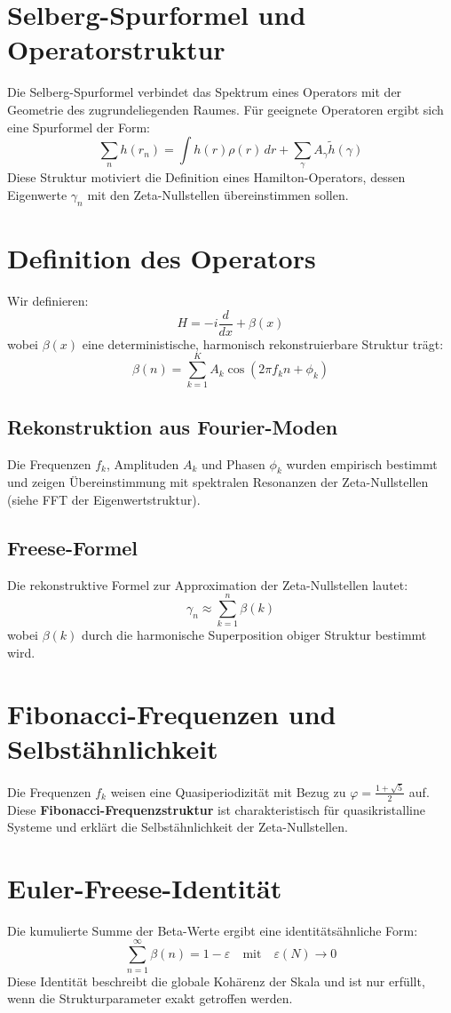 \documentclass[12pt]{article}
\begin{document}
\section{Selberg-Spurformel und Operatorstruktur}

Die Selberg-Spurformel verbindet das Spektrum eines Operators mit der Geometrie des zugrundeliegenden Raumes. Für geeignete Operatoren ergibt sich eine Spurformel der Form:
\[
\sum_n h(r_n) = \int h(r) \rho(r) \, dr + \sum_\gamma A_\gamma \tilde{h}(\gamma)
\]
Diese Struktur motiviert die Definition eines Hamilton-Operators, dessen Eigenwerte \(\gamma_n\) mit den Zeta-Nullstellen übereinstimmen sollen.

\section{Definition des Operators}
Wir definieren:
\[
H = -i \frac{d}{dx} + \beta(x)
\]
wobei \(\beta(x)\) eine deterministische, harmonisch rekonstruierbare Struktur trägt:
\[
\beta(n) = \sum_{k=1}^K A_k \cos(2\pi f_k n + \phi_k)
\]

\subsection{Rekonstruktion aus Fourier-Moden}
Die Frequenzen \(f_k\), Amplituden \(A_k\) und Phasen \(\phi_k\) wurden empirisch bestimmt und zeigen Übereinstimmung mit spektralen Resonanzen der Zeta-Nullstellen (siehe FFT der Eigenwertstruktur).

\subsection{Freese-Formel}
Die rekonstruktive Formel zur Approximation der Zeta-Nullstellen lautet:
\[
\gamma_n \approx \sum_{k=1}^{n} \beta(k)
\]
wobei \(\beta(k)\) durch die harmonische Superposition obiger Struktur bestimmt wird.

\section{Fibonacci-Frequenzen und Selbstähnlichkeit}
Die Frequenzen \(f_k\) weisen eine Quasiperiodizität mit Bezug zu \(\varphi = \frac{1 + \sqrt{5}}{2}\) auf. Diese \textbf{Fibonacci-Frequenzstruktur} ist charakteristisch für quasikristalline Systeme und erklärt die Selbstähnlichkeit der Zeta-Nullstellen.

\section{Euler-Freese-Identität}
Die kumulierte Summe der Beta-Werte ergibt eine identitätsähnliche Form:
\[
\sum_{n=1}^\infty \beta(n) = 1 - \varepsilon
\quad \text{mit} \quad \varepsilon(N) \to 0
\]
Diese Identität beschreibt die globale Kohärenz der Skala und ist nur erfüllt, wenn die Strukturparameter exakt getroffen werden.
\end{document}
